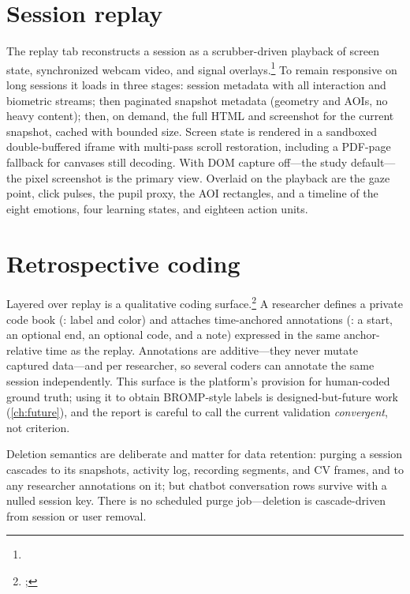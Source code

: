 \section{Session replay}
\label{sec:sensing-replay}

The replay tab reconstructs a session as a scrubber-driven playback of
screen state, synchronized webcam video, and signal
overlays.\footnote{}
To remain responsive on long sessions it loads in three stages: session
metadata with all interaction and biometric streams; then paginated
snapshot metadata (geometry and AOIs, no heavy content); then, on demand,
the full HTML and screenshot for the current snapshot, cached with
bounded size. Screen state is rendered in a sandboxed double-buffered
iframe with multi-pass scroll restoration, including a PDF-page fallback
for canvases still decoding. With DOM capture off---the study default---
the pixel screenshot is the primary view. Overlaid on the playback are the
gaze point, click pulses, the pupil proxy, the AOI rectangles, and a
timeline of the eight emotions, four learning states, and eighteen action
units.

\section{Retrospective coding}
\label{sec:sensing-coding}

Layered over replay is a qualitative coding
surface.\footnote{;
} A researcher defines a private
code book (: label and color) and attaches
time-anchored annotations (: a start, an optional
end, an optional code, and a note) expressed in the same anchor-relative
time as the replay. Annotations are additive---they never mutate captured
data---and per researcher, so several coders can annotate the same session
independently. This surface is the platform's provision for human-coded
ground truth; using it to obtain BROMP-style labels
\citep{ocumpaugh2015} is designed-but-future work (\cref{ch:future}), and
the report is careful to call the current validation \emph{convergent},
not criterion.

Deletion semantics are deliberate and matter for data retention: purging a
session cascades to its snapshots, activity log, recording segments, and
CV frames, and to any researcher annotations on it; but chatbot
conversation rows survive with a nulled session key. There is no scheduled
purge job---deletion is cascade-driven from session or user removal.

